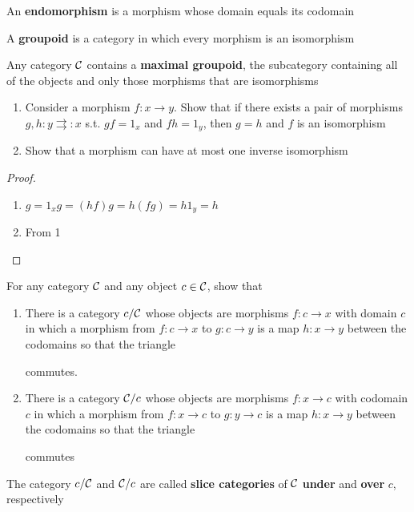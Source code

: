 \documentclass[11pt]{article}
\begin{document}
An \textbf{endomorphism} is a morphism whose domain equals its codomain

\begin{definition}[]
A \textbf{groupoid} is a category in which every morphism is an isomorphism
\end{definition}

\begin{lemma}[]
Any category \(\mathcal{C}\) contains a \textbf{maximal groupoid}, the subcategory containing all of the objects
and only those morphisms that are isomorphisms
\end{lemma}

\begin{exercise}
\label{1.1.1}
\begin{enumerate}
\item Consider a morphism \(f:x\to y\). Show that if there exists a pair of
morphisms \(g,h:y\rightrightarrows:x\) s.t. \(gf=1_x\) and \(fh=1_y\), then \(g=h\) and \(f\)
is an isomorphism
\item Show that a morphism can have at most one inverse isomorphism
\end{enumerate}
\end{exercise}

\begin{proof}
\begin{enumerate}
\item \(g=1_xg=(hf)g=h(fg)=h1_y=h\)
\item From 1
\end{enumerate}
\end{proof}

\begin{exercise}
\label{ex1.1.3}
For any category \(\mathcal{C}\) and any object \(c\in\mathcal{C}\), show that
\begin{enumerate}
\item There is a category \(c/\mathcal{C}\) whose objects are morphisms \(f:c\to x\) with domain \(c\) in which
a morphism from \(f:c\to x\) to \(g:c\to y\) is a map \(h:x\to y\) between the codomains so that
the triangle
\begin{center}\end{center}
commutes.
\item There is a category \(\mathcal{C}/c\) whose objects are morphisms \(f:x\to c\) with codomain \(c\) in which
a morphism from \(f:x\to c\) to \(g:y\to c\) is a map \(h:x\to y\) between the codomains so that
the triangle
\begin{center}\end{center}
commutes
\end{enumerate}


The category \(c/\mathcal{C}\) and \(\mathcal{C}/c\) are called \textbf{slice categories} of \(\mathcal{C}\) \textbf{under} and \textbf{over} \(c\), respectively
\end{exercise}
\end{document}
